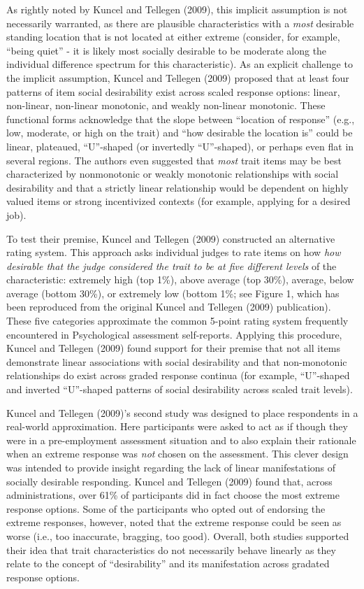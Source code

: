 \documentclass[
  english,
  ,jou]{apa6}
\begin{document}
As rightly noted by Kuncel and Tellegen (2009), this implicit assumption is not necessarily warranted, as there are plausible characteristics with a \emph{most} desirable standing location that is not located at either extreme (consider, for example, \enquote{being quiet} - it is likely most socially desirable to be moderate along the individual difference spectrum for this characteristic). As an explicit challenge to the implicit assumption, Kuncel and Tellegen (2009) proposed that at least four patterns of item social desirability exist across scaled response options: linear, non-linear, non-linear monotonic, and weakly non-linear monotonic. These functional forms acknowledge that the slope between \enquote{location of response} (e.g., low, moderate, or high on the trait) and \enquote{how desirable the location is} could be linear, plateaued, \enquote{U}-shaped (or invertedly \enquote{U}-shaped), or perhaps even flat in several regions. The authors even suggested that \emph{most} trait items may be best characterized by nonmonotonic or weakly monotonic relationships with social desirability and that a strictly linear relationship would be dependent on highly valued items or strong incentivized contexts (for example, applying for a desired job).

To test their premise, Kuncel and Tellegen (2009) constructed an alternative rating system. This approach asks individual judges to rate items on how \emph{how desirable that the judge considered the trait to be at five different levels} of the characteristic: extremely high (top 1\%), above average (top 30\%), average, below average (bottom 30\%), or extremely low (bottom 1\%; see Figure 1, which has been reproduced from the original Kuncel and Tellegen (2009) publication). These five categories approximate the common 5-point rating system frequently encountered in Psychological assessment self-reports. Applying this procedure, Kuncel and Tellegen (2009) found support for their premise that not all items demonstrate linear associations with social desirability and that non-monotonic relationships do exist across graded response continua (for example, \enquote{U}-shaped and inverted \enquote{U}-shaped patterns of social desirability across scaled trait levels).

Kuncel and Tellegen (2009)'s second study was designed to place respondents in a real-world approximation. Here participants were asked to act as if though they were in a pre-employment assessment situation and to also explain their rationale when an extreme response was \emph{not} chosen on the assessment. This clever design was intended to provide insight regarding the lack of linear manifestations of socially desirable responding. Kuncel and Tellegen (2009) found that, across administrations, over 61\% of participants did in fact choose the most extreme response options. Some of the participants who opted out of endorsing the extreme responses, however, noted that the extreme response could be seen as worse (i.e., too inaccurate, bragging, too good). Overall, both studies supported their idea that trait characteristics do not necessarily behave linearly as they relate to the concept of \enquote{desirability} and its manifestation across gradated response options.
\end{document}
